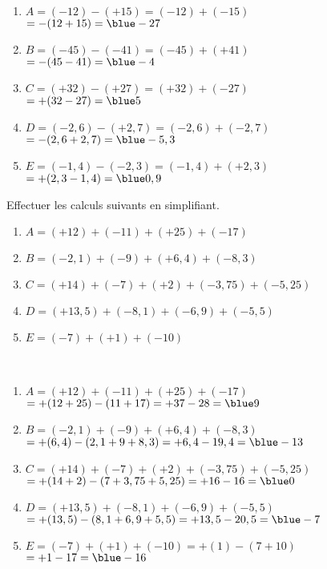\begin{colonne*exercice}
\begin{corrige}
   \ \\ [-5mm]
   \begin{enumerate}
      \item $A =(-12)-(+15)=(-12)+(-15)$ \\
         \qquad\; $=-(12+15) =\blue -27$
      \item $B =(-45)-(-41) =(-45)+(+41)$ \\
         \qquad\; $=-(45-41) =\blue -4$
      \item $C =(+32)-(+27) =(+32)+(-27)$ \\
         \qquad\; $=+(32-27) =\blue 5$
      \item $D =(-2,6)-(+2,7) =(-2,6)+(-2,7)$ \\
         \qquad\; $=-(2,6+2,7) =\blue -5,3$
      \item $E =(-1,4)-(-2,3) =(-1,4)+(+2,3)$ \\
         \qquad\; $=+(2,3-1,4) =\blue 0,9$
   \end{enumerate}
\end{corrige}

\bigskip


\begin{exercice} %
   Effectuer les calculs suivants en simplifiant.
   \begin{enumerate}
      \item $A =(+12) + (-11) + (+25) + (-17)$
      \item $B = (-2,1) + (-9) + (+6,4) + (-8,3)$
      \item $C = (+14) + (-7) + (+2) + (-3,75) + (-5,25)$
      \item $D = (+13,5) + (-8,1) + (-6,9) + (-5,5)$
      \item $E=(-7)+(+1)+(-10)$
   \end{enumerate}
\end{exercice}

\begin{corrige}
   \ \\ [-5mm]
   \begin{enumerate}
      \item $A =(+12) + (-11) + (+25) + (-17)$ \\
         \qquad\; $=+(12+25)-(11+17) =+37-28 =\blue 9$
      \item $B = (-2,1) + (-9) + (+6,4) + (-8,3)$ \\
         \quad $=+(6,4)-(2,1+9+8,3) =+6,4-19,4 =\blue -13$
      \item $C = (+14) + (-7) + (+2) + (-3,75) + (-5,25)$ \\
         \quad $=+(14+2)-(7+3,75+5,25) =+16-16 ={\blue 0}$
      \item $D = (+13,5) + (-8,1) + (-6,9) + (-5,5)$ \\
         $=+(13,5)-(8,1+6,9+5,5) =+13,5-20,5 =\blue -7$
      \item $E=(-7)+(+1)+(-10) =+(1)-(7+10)$ \\
        \qquad\; $=+1-17 =\blue -16$
   \end{enumerate}
\end{corrige}


\end{colonne*exercice}
